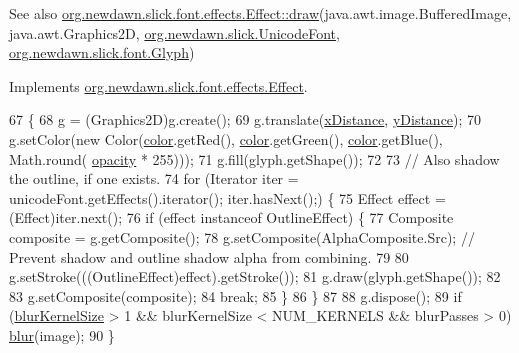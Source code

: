 \begin{DoxySeeAlso}{See also}
\mbox{\hyperlink{interfaceorg_1_1newdawn_1_1slick_1_1font_1_1effects_1_1_effect_a234db1cd6151bdbe9fda2099ee71eafb}{org.\+newdawn.\+slick.\+font.\+effects.\+Effect\+::draw}}(java.\+awt.\+image.\+Buffered\+Image, java.\+awt.\+Graphics2D, \mbox{\hyperlink{classorg_1_1newdawn_1_1slick_1_1_unicode_font}{org.\+newdawn.\+slick.\+Unicode\+Font}}, \mbox{\hyperlink{classorg_1_1newdawn_1_1slick_1_1font_1_1_glyph}{org.\+newdawn.\+slick.\+font.\+Glyph}}) 
\end{DoxySeeAlso}


Implements \mbox{\hyperlink{interfaceorg_1_1newdawn_1_1slick_1_1font_1_1effects_1_1_effect_a234db1cd6151bdbe9fda2099ee71eafb}{org.\+newdawn.\+slick.\+font.\+effects.\+Effect}}.


\begin{DoxyCode}
67                                                                                               \{
68         g = (Graphics2D)g.create();
69         g.translate(\mbox{\hyperlink{classorg_1_1newdawn_1_1slick_1_1font_1_1effects_1_1_shadow_effect_a4d3581fba8877de112c8a1ec28cdf03d}{xDistance}}, \mbox{\hyperlink{classorg_1_1newdawn_1_1slick_1_1font_1_1effects_1_1_shadow_effect_a06d791511d507ab313c764edbde43fa8}{yDistance}});
70         g.setColor(\textcolor{keyword}{new} Color(\mbox{\hyperlink{classorg_1_1newdawn_1_1slick_1_1font_1_1effects_1_1_shadow_effect_a4a5a1c31b38b33b042cadabe1593bc62}{color}}.getRed(), \mbox{\hyperlink{classorg_1_1newdawn_1_1slick_1_1font_1_1effects_1_1_shadow_effect_a4a5a1c31b38b33b042cadabe1593bc62}{color}}.getGreen(), \mbox{\hyperlink{classorg_1_1newdawn_1_1slick_1_1font_1_1effects_1_1_shadow_effect_a4a5a1c31b38b33b042cadabe1593bc62}{color}}.getBlue(), Math.round(
      \mbox{\hyperlink{classorg_1_1newdawn_1_1slick_1_1font_1_1effects_1_1_shadow_effect_a6a03f4db2ffd55023ab5f9fde923dc0e}{opacity}} * 255)));
71         g.fill(glyph.getShape());
72 
73         \textcolor{comment}{// Also shadow the outline, if one exists.}
74         \textcolor{keywordflow}{for} (Iterator iter = unicodeFont.getEffects().iterator(); iter.hasNext();) \{
75             Effect effect = (Effect)iter.next();
76             \textcolor{keywordflow}{if} (effect instanceof OutlineEffect) \{
77                 Composite composite = g.getComposite();
78                 g.setComposite(AlphaComposite.Src); \textcolor{comment}{// Prevent shadow and outline shadow alpha from
       combining.}
79 
80                 g.setStroke(((OutlineEffect)effect).getStroke());
81                 g.draw(glyph.getShape());
82 
83                 g.setComposite(composite);
84                 \textcolor{keywordflow}{break};
85             \}
86         \}
87 
88         g.dispose();
89         \textcolor{keywordflow}{if} (\mbox{\hyperlink{classorg_1_1newdawn_1_1slick_1_1font_1_1effects_1_1_shadow_effect_a9383b2ba78f68f6302bfd9e9cb5de0f0}{blurKernelSize}} > 1 && blurKernelSize < NUM\_KERNELS && blurPasses > 0) 
      \mbox{\hyperlink{classorg_1_1newdawn_1_1slick_1_1font_1_1effects_1_1_shadow_effect_aed27870d89b30c23752f5dfc30314578}{blur}}(image);
90     \}
\end{DoxyCode}
